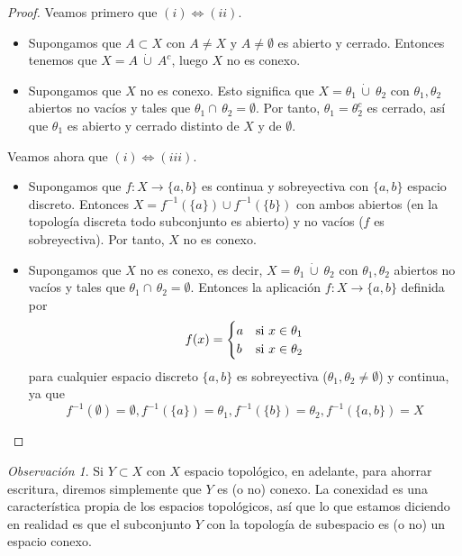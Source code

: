 \documentclass[12pt]{report}
\theoremstyle{definition}
\theoremstyle{definition}
\theoremstyle{remark}
\newtheorem*{obs}{Observación} %
\begin{document}
\begin{proof}
Veamos primero que $(i) \iff (ii)$.
\begin{itemize}
    \item[{\fbox[rb]{$\Rightarrow$}}] Supongamos que $A \subset X$ con $A \neq X$ y $A \neq \emptyset$ es abierto y cerrado. Entonces tenemos que $X = A \ \dot\cup \ A^c$, luego $X$ no es conexo.
    \item[{\fbox[rb]{$\Leftarrow$}}] Supongamos que $X$ no es conexo. Esto significa que $X = \theta_1 \, \dot\cup \ \theta_2$ con $\theta_1, \theta_2$ abiertos no vacíos y tales que $\theta_1 \cap \, \theta_2 = \emptyset$. Por tanto, $\theta_1 = \theta_2^c$ es cerrado, así que $\theta_1$ es abierto y cerrado distinto de $X$ y de $\emptyset$.
\end{itemize}

\vspace{2mm}
Veamos ahora que $(i) \iff (iii)$.
\begin{itemize}
    \item[{\fbox[rb]{$\Rightarrow$}}] Supongamos que $f \colon X \to \{a,b\}$ es continua y sobreyectiva con $\{a,b\}$ espacio discreto. Entonces $X = f^{-1}(\{a\}) \cup f^{-1}(\{b\})$ con ambos abiertos (en la topología discreta todo subconjunto es abierto) y no vacíos ($f$ es sobreyectiva). Por tanto, $X$ no es conexo.
    \item[{\fbox[rb]{$\Leftarrow$}}] Supongamos que $X$ no es conexo, es decir, $X = \theta_1 \, \dot\cup \ \theta_2$ con $\theta_1, \theta_2$ abiertos no vacíos y tales que $\theta_1 \cap \, \theta_2 = \emptyset$. Entonces la aplicación $f \colon X \to \{a,b\}$ definida por
    \[
    f(x) =
    \begin{cases}
        a & $si$ \ x \in \theta_1 \\
        b & $si$ \ x \in \theta_2
    \end{cases}
    \]
    para cualquier espacio discreto $\{a,b\}$ es sobreyectiva ($\theta_1, \theta_2 \neq \emptyset$) y continua, ya que \[f^{-1}(\emptyset) = \emptyset, f^{-1}(\{a\}) = \theta_1, f^{-1}(\{b\}) = \theta_2, f^{-1}(\{a,b\}) = X\]
\end{itemize}
\end{proof}

\begin{obs}
Si $Y \subset X$ con $X$ espacio topológico, en adelante, para ahorrar escritura, diremos simplemente que $Y$ es (o no) conexo. La conexidad es una característica propia de los espacios topológicos, así que lo que estamos diciendo en realidad es que el subconjunto $Y$ con la topología de subespacio es (o no) un espacio conexo.
\end{obs}
\end{document}
